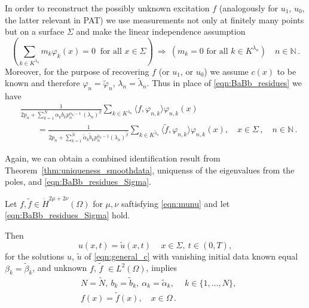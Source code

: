 In order to reconstruct the possibly unknown excitation $f$ (analogously for $u_1$, $u_0$, the latter relevant in PAT) we use measurements not only at finitely many points but on a surface $\Sigma$  
and make the linear independence assumption
\begin{equation}\label{eqn:ass_inj_Sigma_rem}
\left(\sum_{k\in K^{\lambda_n}} m_k \varphi_k(x) = 0 \ \mbox{ for all }x\in\Sigma\right)
\ \Longrightarrow \ \left(m_k=0 \mbox{ for all }k\in K^{\lambda_n}\right)
\quad n\in\mathbb{N}\,.
\end{equation}
Moreover, for the purpose of recovering $f$ (or $u_1$, or $u_0$) we assume $c(x)$ to be known and therefore $\varphi_{n}=\tilde{\varphi}_{n}$, $\lambda_{n}=\tilde{\lambda}_{n}$.
Thus in place of \eqref{eqn:BaBb_residues} we have
\begin{equation}\label{eqn:BaBb_residues_Sigma}
\begin{aligned}
&\frac{1}{
2p_n+\sum_{k=1}^N \alpha_k b_k p_n^{\alpha_k-1}\, (\lambda_{n})^\beta}
\sum_{k\in K^{\lambda_n}}\langle f,\varphi_{n,k}\rangle \varphi_{n,k}(x)
\\&\qquad
=\frac{1}{
2p_n+\sum_{k=1}^{\tilde N} {\tilde \alpha}_k \tilde{b}_k p_n^{{\tilde \alpha}_k-1}(\lambda_{n})^{\tilde{\beta}}}
\sum_{k\in K^{\tilde{\lambda}_n}}\langle \tilde{f},\varphi_{n,k}\rangle \varphi_{n,k}(x), 
\quad x\in\Sigma\,, \quad n\in\mathbb{N}\,. 
\end{aligned}
\end{equation}

Again, we can obtain a combined identification result from Theorem~\ref{thm:uniqueness_smoothdata}, uniquenss of the eigenvalues from the poles, and \eqref{eqn:BaBb_residues_Sigma}.

\begin{corollary}\label{cor:uniqueness_smoothdata_and_f}
Let $f,\tilde{f}\in \dot{H}^{2\mu+2\nu}(\Omega)$ for $\mu,\nu$ saftisfying \eqref{eqn:munu} and let  
\eqref{eqn:BaBb_residues_Sigma} hold.

Then
\[
u(x,t) = \tilde{u}(x,t)\, \quad x\in\Sigma, \ t\in(0,T), 
\]
for the solutions $u$, $\tilde{u}$ of \eqref{eqn:general_c}
with vanishing initial data known equal $\beta_k=\tilde{\beta}_k$, and unknown $f$, $\tilde{f}$ $\in L^2(\Omega)$,
implies
\[
\begin{aligned}
&N=\tilde{N}, \ 
b_k=\tilde{b}_k, \ \alpha_k=\tilde{\alpha}_k, \ 
\quad k\in\{1,\ldots,N\}, 
\\ 
&f(x)=\tilde{f}(x), \quad x\in\Omega\,. 
\end{aligned}
\]
\end{corollary}

